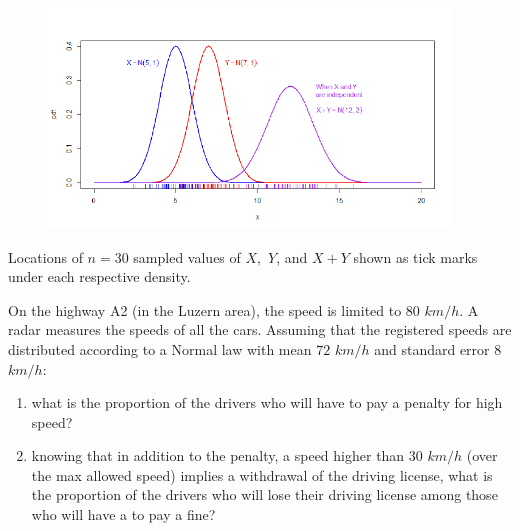 \documentclass[smaller]{beamer}\usepackage[]{graphicx}\usepackage[]{color}
\begin{document}
\begin{frame}{\subsecname}
  \begin{figure}[ptb]\centering
  \includegraphics[width=0.95\textwidth,height=0.7\textheight]{img/sum_of_two_independent_normals_with_rug__1.pdf}%
  \end{figure}
  Locations of $n=30$ sampled values of $X,$ $Y$, and $X+Y$ shown as tick marks under each respective density.
\end{frame}


\begin{frame}{\subsecname}



\begin{example}

On the highway A2 (in the Luzern area), the speed is limited to $80$ $km/h$. A radar measures the speeds of all the cars.
Assuming that the registered speeds are distributed according to a Normal law with mean $72$ $km/h$ and standard error $8$ $km/h$: \vspace{0.2cm}
\begin{enumerate}
  \item what is the proportion of the drivers who will have to pay a penalty for high speed? \vspace{0.2cm}
  \item knowing that in addition to the penalty, a speed higher than $30$ $km/h$ (over the max allowed speed) implies a withdrawal of the driving license, what is the proportion of the drivers who  will lose their driving license among those who will have a to pay a fine?
\end{enumerate}

\end{example}
\end{frame}
\end{document}
